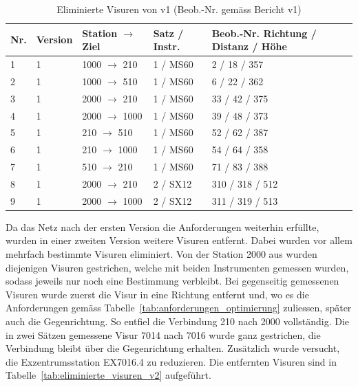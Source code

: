 \begin{table}[H]
    \centering
    \begin{tabular}{p{0.8cm} p{1.2cm} p{3.2cm} p{2.5cm} p{5.3cm}}
        \toprule
        Nr. & Version & Station $\rightarrow$ Ziel & Satz / Instr. & Beob.-Nr. Richtung / Distanz / Höhe \\
        \midrule
        1  & 1 & 1000 $\rightarrow$ 210   & 1 / MS60 & 2 / 18 / 357 \\
        2  & 1 & 1000 $\rightarrow$ 510   & 1 / MS60 & 6 / 22 / 362 \\
        3  & 1 & 2000 $\rightarrow$ 210   & 1 / MS60 & 33 / 42 / 375 \\
        4  & 1 & 2000 $\rightarrow$ 1000  & 1 / MS60 & 39 / 48 / 373 \\
        5  & 1 & 210 $\rightarrow$ 510    & 1 / MS60 & 52 / 62 / 387 \\
        6  & 1 & 210 $\rightarrow$ 1000   & 1 / MS60 & 54 / 64 / 358 \\
        7  & 1 & 510 $\rightarrow$ 210    & 1 / MS60 & 71 / 83 / 388 \\
        8  & 1 & 2000 $\rightarrow$ 210   & 2 / SX12 & 310 / 318 / 512 \\
        9  & 1 & 2000 $\rightarrow$ 1000  & 2 / SX12 & 311 / 319 / 513 \\
        \bottomrule
    \end{tabular}
    \caption{Eliminierte Visuren von v1 (Beob.-Nr. gemäss Bericht v1)}
    \label{tab:eliminierte_visuren_v1}
\end{table}
\label{sec:v0}
\bigskip
Da das Netz nach der ersten Version die Anforderungen weiterhin erfüllte, wurden in einer zweiten Version weitere
Visuren entfernt. Dabei wurden vor allem mehrfach bestimmte Visuren eliminiert. Von der Station 2000 aus wurden
diejenigen Visuren gestrichen, welche mit beiden Instrumenten gemessen wurden, sodass jeweils nur noch eine Bestimmung
verbleibt. Bei gegenseitig gemessenen Visuren wurde zuerst die Visur in eine Richtung entfernt und, wo es die
Anforderungen gemäss Tabelle~\ref{tab:anforderungen_optimierung} zuliessen, später auch die Gegenrichtung. So entfiel
die Verbindung 210 nach 2000 vollständig. Die in zwei Sätzen gemessene Visur 7014 nach 7016 wurde ganz gestrichen,
die Verbindung bleibt über die Gegenrichtung erhalten. Zusätzlich wurde versucht, die Exzentrumsstation EX7016.4 zu
reduzieren. Die entfernten Visuren sind in Tabelle~\ref{tab:eliminierte_visuren_v2} aufgeführt.\bigskip 

